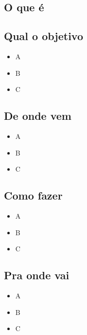 \documentclass[
]{article}
\providecommand{\tightlist}{%
  \setlength{\itemsep}{0pt}\setlength{\parskip}{0pt}}
\begin{document}
\hypertarget{o-que-uxe9-5}{%
\subsection*{O que é}\label{o-que-uxe9-5}}

\hypertarget{qual-o-objetivo-5}{%
\subsection*{Qual o objetivo}\label{qual-o-objetivo-5}}

\begin{itemize}
\tightlist
\item
  A
\item
  B
\item
  C
\end{itemize}

\hypertarget{de-onde-vem-5}{%
\subsection*{De onde vem}\label{de-onde-vem-5}}

\begin{itemize}
\tightlist
\item
  A
\item
  B
\item
  C
\end{itemize}

\hypertarget{como-fazer-5}{%
\subsection*{Como fazer}\label{como-fazer-5}}

\begin{itemize}
\tightlist
\item
  A
\item
  B
\item
  C
\end{itemize}

\hypertarget{pra-onde-vai-5}{%
\subsection*{Pra onde vai}\label{pra-onde-vai-5}}

\begin{itemize}
\tightlist
\item
  A
\item
  B
\item
  C
\end{itemize}
\end{document}
